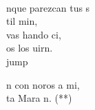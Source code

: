 \begin{cancion}
\begin{chorus}
	\end{chorus}%
	\jump\\
	nque parezcan tus s\\
	til min, \\
	 vas hando ci, \\
	os los uirn.\\jump\\
	\begin{chorus}%
	n con noros a mi,\\
	ta Mara n. (**)\\
	\end{chorus}%
	\jump\\
\end{cancion}%
